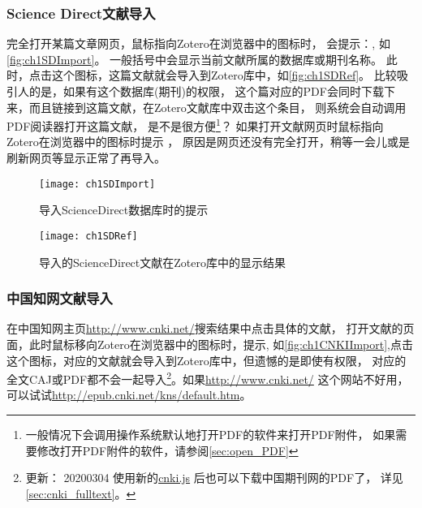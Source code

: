 \documentclass[cn,11pt,chinese]{elegantbook}
\begin{document}
		\subsubsection{Science Direct文献导入}
			完全打开某篇文章网页，鼠标指向Zotero在浏览器中的图标时，
			会提示：, 如\autoref{fig:ch1SDImport}。
			一般括号中会显示当前文献所属的数据库或期刊名称。
			此时，点击这个图标，这篇文献就会导入到Zotero库中，如\autoref{fig:ch1SDRef}。
			比较吸引人的是，如果有这个数据库(期刊)的权限，
			这个篇对应的PDF会同时下载下来，而且链接到这篇文献，在Zotero文献库中双击这个条目，
			则系统会自动调用PDF阅读器打开这篇文献，
			是不是很方便\footnote{一般情况下会调用操作系统默认地打开PDF的软件来打开PDF附件，
			如果需要修改打开PDF附件的软件，请参阅\cref{sec:open_PDF}}？
			如果打开文献网页时鼠标指向Zotero在浏览器中的图标时提示
			，
			原因是网页还没有完全打开，稍等一会儿或是刷新网页等显示正常了再导入。
			\begin{figure}[htbp]
				\centering
				\texttt{[image: ch1SDImport]}
				\caption{导入ScienceDirect数据库时的提示}
				\label{fig:ch1SDImport}
			\end{figure}
			\begin{figure}
				\centering
				\texttt{[image: ch1SDRef]}
				\caption{导入的ScienceDirect文献在Zotero库中的显示结果}
				\label{fig:ch1SDRef}
			\end{figure}
	\subsubsection{中国知网文献导入} \label{sec:cnki}
	在中国知网主页\url{http://www.cnki.net/}搜索结果中点击具体的文献，
	打开文献的页面，此时鼠标移向Zotero在浏览器中的图标时，提示,
	如\autoref{fig:ch1CNKIImport},点击这个图标，对应的文献就会导入到Zotero库中，但遗憾的是即使有权限，
	对应的全文CAJ或PDF都不会一起导入\footnote{更新：
	20200304 使用新的\href{https://github.com/Zotero-CN/translators_CN}{cnki.js}
	后也可以下载中国期刊网的PDF了，
	详见\cref{sec:cnki_fulltext}。}。如果\url{http://www.cnki.net/}
	这个网站不好用，可以试试\url{http://epub.cnki.net/kns/default.htm}。
\end{document}
